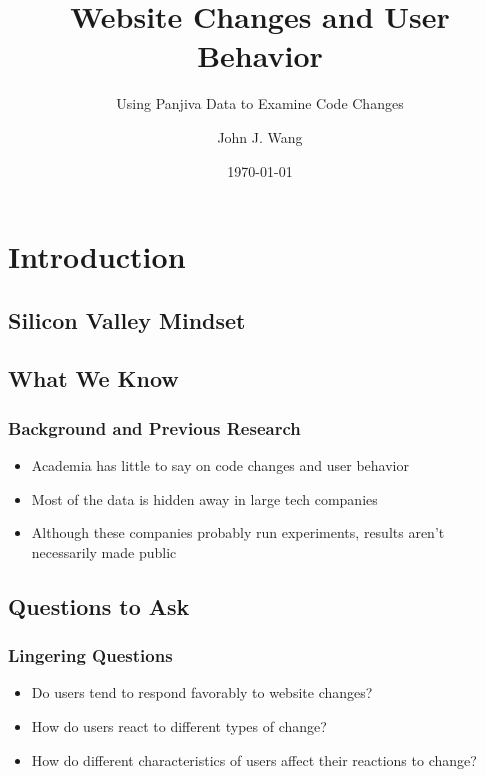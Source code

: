 \documentclass[xcolor=pdftex,dvipsnames,table]{beamer}
\title{Website Changes and User Behavior}
\subtitle{Using Panjiva Data to Examine Code Changes}
\author{John J. Wang}
\date{\today}
\institute{14.27 Final Presentation}
\begin{document}
\frame{\titlepage}

\frame{\tableofcontents}

\section[Introduction]{Introduction}

\subsection{Silicon Valley Mindset}

\frame{\tableofcontents[currentsubsection]}


\subsection{What We Know}

\frame{\tableofcontents[currentsubsection]}

\frame
{
    \frametitle{Background and Previous Research}
    \begin{itemize}
        \item Academia has little to say on code changes and user behavior
        \item Most of the data is hidden away in large tech companies
        \item Although these companies probably run experiments, results aren't necessarily made public
    \end{itemize}
}

\subsection{Questions to Ask}

\frame{\tableofcontents[currentsubsection]}

\frame
{
    \frametitle{Lingering Questions}
    \begin{itemize}
        \item Do users tend to respond favorably to website changes?
        \item How do users react to different types of change?
        \item How do different characteristics of users affect their reactions to change?
    \end{itemize}
}
\end{document}
